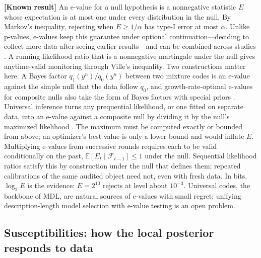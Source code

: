 \documentclass[11pt,a4paper]{article}
\newcommand{\E}{\mathbb E}
\newcommand{\evl}[2]{{\small\bfseries\color{#1}[#2]}}
\newcommand{\LKnown}{\evl{cknown}{Known result}}
\begin{document}
\LKnown{} An e-value for a null hypothesis is a nonnegative statistic $E$
whose expectation is at most one under every distribution in the null. By
Markov's inequality, rejecting when $E\ge1/\alpha$ has type-I error at most
$\alpha$. Unlike p-values, e-values keep this guarantee under optional
continuation---deciding to collect more data after seeing earlier
results---and can be combined across studies
\cite{grunwald2024safe,ramdas2023}. A running likelihood ratio that is a
nonnegative martingale under the null gives anytime-valid monitoring
through Ville's inequality. Two constructions matter here. A Bayes factor
$q_1(y^n)/q_0(y^n)$ between two mixture codes is an e-value against the
simple null that the data follow $q_0$, and growth-rate-optimal e-values for
composite nulls also take the form of Bayes factors with special priors
\cite{grunwald2024safe}. Universal inference turns any prequential likelihood, or one fitted on separate data, into an e-value against a composite null by dividing it by the null's maximized likelihood \cite{wasserman2020}. The maximum must be computed exactly or bounded from above; an optimizer's best value is only a lower bound and would inflate $E$. Multiplying e-values from successive rounds requires each to be valid conditionally on the past, $\E[E_t\mid\mathcal F_{t-1}]\le1$ under the null. Sequential likelihood ratios satisfy this by construction under the null that defines them; repeated calibrations of the same audited object need not, even with fresh data. In bits, $\log_2E$ is the
evidence: $E=2^{10}$ rejects at level about $10^{-3}$. Universal codes, the backbone of MDL, are natural sources of e-values with small regret; unifying description-length model selection with e-value testing is an open problem.

\subsection{Susceptibilities: how the local posterior responds to data}
\label{sec:suscept}
\end{document}
